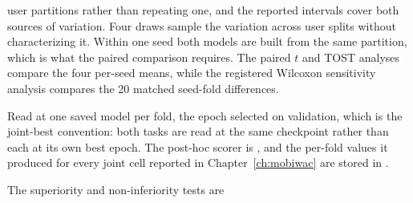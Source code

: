 \begin{description}
        user partitions rather than repeating one, and the reported intervals cover both
        sources of variation. Four draws sample the variation across user splits without
        characterizing it. Within one seed both models are built from the same partition, which is what
        the paired comparison requires. The paired $t$ and TOST analyses compare the four
        per-seed means, while the registered Wilcoxon sensitivity analysis compares the 20
        matched seed-fold differences.
  \item[The reported scores.] Read at one saved model per fold, the epoch selected on
        validation, which is the joint-best convention: both tasks are read at the same
        checkpoint rather than each at its own best epoch. The post-hoc scorer is
        , and the per-fold values it produced for
        every joint cell reported in Chapter~\ref{ch:mobiwac} are stored in
        .
  \item[The significance tests.] The superiority and non-inferiority tests are

\end{description}
